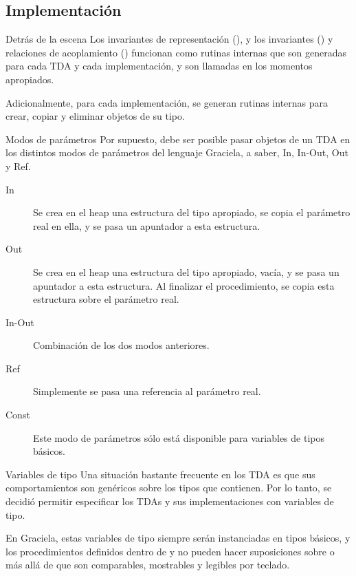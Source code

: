 \subsection*{Implementación}

\begin{frame}{Detrás de la escena}
Los invariantes de representación (), y los invariantes  () y relaciones de acoplamiento () funcionan como rutinas internas que son generadas para cada TDA y cada implementación, y son llamadas en los momentos apropiados. 

Adicionalmente, para cada implementación, se generan rutinas internas para crear, copiar y eliminar objetos de su tipo. 
\end{frame}

\begin{frame}{Modos de parámetros}
Por supuesto, debe ser posible pasar objetos de un TDA en los distintos modos de parámetros del lenguaje Graciela, a saber, In, In-Out, Out y Ref.

\begin{description}
  \item [In]     Se crea en el heap una estructura del tipo apropiado, se copia el parámetro real en ella, y se pasa un apuntador a esta estructura.
  \item [Out]    Se crea en el heap una estructura del tipo apropiado, vacía, y se pasa un apuntador a esta estructura. Al finalizar el procedimiento, se copia esta estructura sobre el parámetro real.
  \item [In-Out] Combinación de los dos modos anteriores. 
  \item [Ref]    Simplemente se pasa una referencia al parámetro real.
  \item [Const]  Este modo de parámetros sólo está disponible para variables de tipos básicos. 
\end{description}

\end{frame}


\begin{frame}{Variables de tipo}
Una situación bastante frecuente en los TDA es que sus comportamientos son genéricos sobre los tipos que contienen. Por lo tanto, se decidió permitir
especificar los TDAs y sus implementaciones con variables de tipo. 

\typevar

En Graciela, estas variables de tipo siempre serán instanciadas en tipos básicos, y los procedimientos definidos dentro de  y  no pueden hacer suposiciones sobre  o  más allá de que son comparables, mostrables y legibles por teclado. 
\end{frame}

